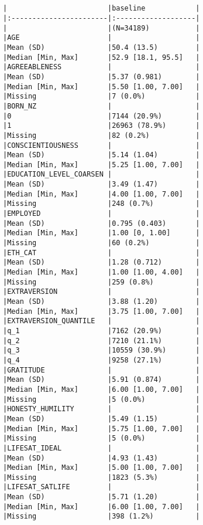 \documentclass[
  singlecolumn]{report}
\begin{document}
\begin{verbatim}


|                        |baseline            |
|:-----------------------|:-------------------|
|                        |(N=34189)           |
|AGE                     |                    |
|Mean (SD)               |50.4 (13.5)         |
|Median [Min, Max]       |52.9 [18.1, 95.5]   |
|AGREEABLENESS           |                    |
|Mean (SD)               |5.37 (0.981)        |
|Median [Min, Max]       |5.50 [1.00, 7.00]   |
|Missing                 |7 (0.0%)            |
|BORN_NZ                 |                    |
|0                       |7144 (20.9%)        |
|1                       |26963 (78.9%)       |
|Missing                 |82 (0.2%)           |
|CONSCIENTIOUSNESS       |                    |
|Mean (SD)               |5.14 (1.04)         |
|Median [Min, Max]       |5.25 [1.00, 7.00]   |
|EDUCATION_LEVEL_COARSEN |                    |
|Mean (SD)               |3.49 (1.47)         |
|Median [Min, Max]       |4.00 [1.00, 7.00]   |
|Missing                 |248 (0.7%)          |
|EMPLOYED                |                    |
|Mean (SD)               |0.795 (0.403)       |
|Median [Min, Max]       |1.00 [0, 1.00]      |
|Missing                 |60 (0.2%)           |
|ETH_CAT                 |                    |
|Mean (SD)               |1.28 (0.712)        |
|Median [Min, Max]       |1.00 [1.00, 4.00]   |
|Missing                 |259 (0.8%)          |
|EXTRAVERSION            |                    |
|Mean (SD)               |3.88 (1.20)         |
|Median [Min, Max]       |3.75 [1.00, 7.00]   |
|EXTRAVERSION_QUANTILE   |                    |
|q_1                     |7162 (20.9%)        |
|q_2                     |7210 (21.1%)        |
|q_3                     |10559 (30.9%)       |
|q_4                     |9258 (27.1%)        |
|GRATITUDE               |                    |
|Mean (SD)               |5.91 (0.874)        |
|Median [Min, Max]       |6.00 [1.00, 7.00]   |
|Missing                 |5 (0.0%)            |
|HONESTY_HUMILITY        |                    |
|Mean (SD)               |5.49 (1.15)         |
|Median [Min, Max]       |5.75 [1.00, 7.00]   |
|Missing                 |5 (0.0%)            |
|LIFESAT_IDEAL           |                    |
|Mean (SD)               |4.93 (1.43)         |
|Median [Min, Max]       |5.00 [1.00, 7.00]   |
|Missing                 |1823 (5.3%)         |
|LIFESAT_SATLIFE         |                    |
|Mean (SD)               |5.71 (1.20)         |
|Median [Min, Max]       |6.00 [1.00, 7.00]   |
|Missing                 |398 (1.2%)          |

\end{verbatim}
\end{document}
